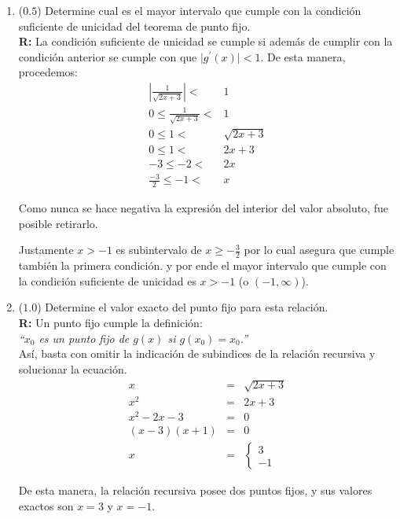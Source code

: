 \documentclass[12pt]{article}
\begin{document}
\begin{enumerate}[leftmargin=*,widest=9]
\begin{enumerate}[label=\alph*]
    \item (\(0.5\)) Determine cual es el mayor intervalo que cumple con la condición suficiente de unicidad del teorema de punto fijo.\\
		\textbf{R:} La condición suficiente de unicidad se cumple si además de cumplir con la condición anterior se cumple con que \(\vert g^{\prime}(x) \vert <1\). De esta manera, procedemos:
		\begin{eqnarray*}
		\left\vert \frac{1}{\sqrt{2x+3}} \right\vert < & 1\\
		0 \leq \frac{1}{\sqrt{2x+3}} < & 1\\
		0 \leq 1 < & \sqrt{2x+3}\\
		0 \leq 1 < & 2x + 3\\
		-3 \leq -2 < & 2x\\
		\frac{-3}{2} \leq -1 < & x
		\end{eqnarray*}

		Como nunca se hace negativa la expresión del interior del valor absoluto, fue posible retirarlo.

		Justamente \(x>-1\) es subintervalo de \(x\geq -\frac{3}{2}\) por lo cual asegura que cumple también la primera condición. y por ende el mayor intervalo que cumple con la condición suficiente de unicidad es \(x>-1\) (o \((-1, \infty)\)).


    \item (\(1.0\)) Determine el valor exacto del punto fijo para esta relación. \\
		\textbf{R:} Un punto fijo cumple la definición:\\
		\textit{``\(x_0\) es un punto fijo de \(g(x)\) si \(g(x_0) = x_0\).''} \\
		Así, basta con omitir la indicación de subindices de la relación recursiva y solucionar la ecuación.\\
		\begin{eqnarray*}
		x &= &\sqrt{2x + 3}\\
		x^2 &= &2x + 3\\
		x^2 - 2x - 3 &= &0 \\
		(x - 3)(x + 1) &= &0\\
		x &= &\left\lbrace \begin{matrix}3 \\ -1 \end{matrix} \right.
		\end{eqnarray*}

		De esta manera, la relación recursiva posee dos puntos fijos, y sus valores exactos son \(x=3\) y \(x=-1\).


\end{enumerate}
\end{enumerate}
\end{document}
